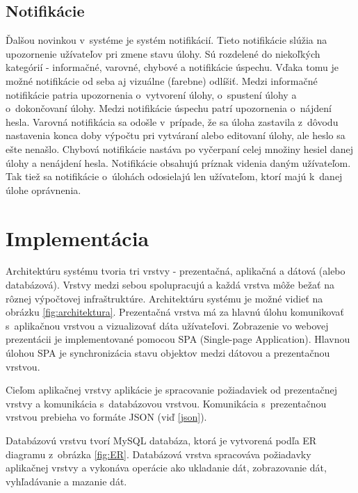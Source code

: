 \documentclass[zadani,slovak]{fitthesis}
\begin{document}
\section{Notifikácie}
Ďalšou novinkou v~systéme je systém notifikácií. Tieto notifikácie slúžia na upozornenie užívateľov pri zmene stavu úlohy. Sú rozdelené do niekoľkých kategórií - informačné, varovné, chybové a notifikácie úspechu. Vďaka tomu je možné notifikácie od seba aj vizuálne (farebne) odlíšiť. Medzi informačné notifikácie patria upozornenia o~vytvorení úlohy, o~spustení úlohy a o~dokončovaní úlohy. Medzi notifikácie úspechu patrí upozornenia o~nájdení hesla. Varovná notifikácia sa odošle v~prípade, že sa úloha zastavila z~dôvodu nastavenia konca doby výpočtu pri vytváraní alebo editovaní úlohy, ale heslo sa ešte nenašlo. Chybová notifikácie nastáva po vyčerpaní celej množiny hesiel danej úlohy a nenájdení hesla. Notifikácie obsahujú príznak videnia daným užívateľom. Tak tiež sa notifikácie o~úlohách odosielajú len užívateľom, ktorí majú k~danej úlohe oprávnenia.





\chapter{Implementácia}\label{implementacia}
Architektúru systému tvoria tri vrstvy - prezentačná, aplikačná a dátová (alebo databázová). Vrstvy medzi sebou spolupracujú a každá vrstva môže bežať na rôznej výpočtovej infraštruktúre. Architektúru systému je možné vidieť na obrázku \ref{fig:architektura}.
Prezentačná vrstva má za hlavnú úlohu komunikovať s~aplikačnou vrstvou a vizualizovať dáta užívateľovi. Zobrazenie vo webovej prezentácii je implementované pomocou SPA (Single-page Application). Hlavnou úlohou SPA je synchronizácia stavu objektov medzi dátovou a prezentačnou vrstvou. 

Cieľom aplikačnej vrstvy aplikácie je spracovanie požiadaviek od prezentačnej vrstvy a komunikácia s~databázovou vrstvou. Komunikácia s~prezentačnou vrstvou prebieha vo formáte JSON (viď \ref{json}).

Databázovú vrstvu tvorí MySQL databáza, ktorá je vytvorená podľa ER diagramu z~obrázka \ref{fig:ER}. Databázová vrstva spracováva požiadavky aplikačnej vrstvy a vykonáva operácie ako ukladanie dát, zobrazovanie dát, vyhľadávanie a mazanie dát.
\end{document}
